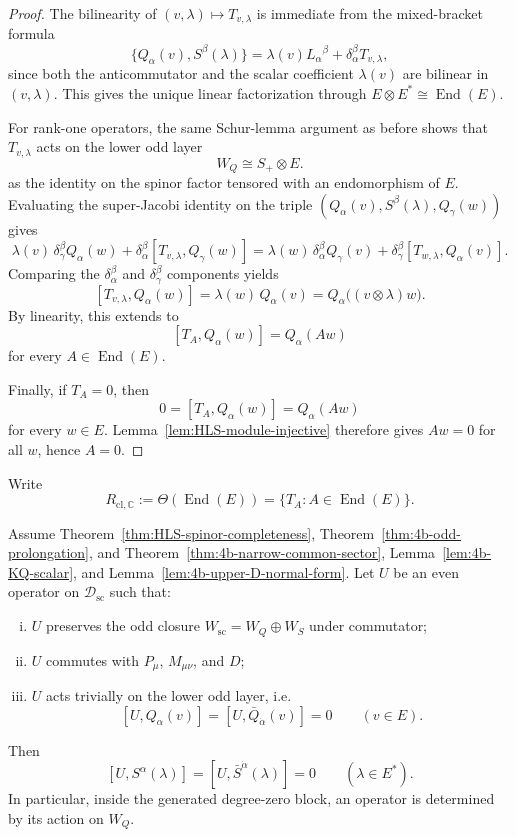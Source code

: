 \begin{proof}
The bilinearity of \((v,\lambda)\mapsto T_{v,\lambda}\) is immediate from the
mixed-bracket formula
\[
  \{Q_\alpha(v),S^\beta(\lambda)\}
  =
  \lambda(v)L_\alpha{}^\beta+\delta_\alpha^\beta T_{v,\lambda},
\]
since both the anticommutator and the scalar coefficient \(\lambda(v)\) are
bilinear in \((v,\lambda)\). This gives the unique linear factorization through
\(E\otimes E^*\cong\operatorname{End}(E)\).

For rank-one operators, the same Schur-lemma argument as before shows that
\(T_{v,\lambda}\) acts on the lower odd layer
\[
  W_Q\cong S_+\otimes E.
\]
as the identity on the spinor factor tensored with an endomorphism of \(E\).
Evaluating the super-Jacobi identity on the triple
\((Q_\alpha(v),S^\beta(\lambda),Q_\gamma(w))\) gives
\[
  \lambda(v)\,\delta_\gamma^\beta Q_\alpha(w)
  +
  \delta_\alpha^\beta [T_{v,\lambda},Q_\gamma(w)]
  =
  \lambda(w)\,\delta_\alpha^\beta Q_\gamma(v)
  +
  \delta_\gamma^\beta [T_{w,\lambda},Q_\alpha(v)].
\]
Comparing the \(\delta_\alpha^\beta\) and \(\delta_\gamma^\beta\) components yields
\[
  [T_{v,\lambda},Q_\alpha(w)]
  =
  \lambda(w)\,Q_\alpha(v)
  =
  Q_\alpha\bigl((v\otimes\lambda)w\bigr).
\]
By linearity, this extends to
\[
  [T_A,Q_\alpha(w)]
  =
  Q_\alpha(Aw)
\]
for every \(A\in\operatorname{End}(E)\).

Finally, if \(T_A=0\), then
\[
  0=[T_A,Q_\alpha(w)]=Q_\alpha(Aw)
\]
for every \(w\in E\). Lemma~\ref{lem:HLS-module-injective} therefore gives
\(Aw=0\) for all \(w\), hence \(A=0\).
\end{proof}

Write
\[
  R_{\mathrm{cl},\mathbb C}
  :=
  \Theta(\operatorname{End}(E))
  =
  \{T_A:A\in\operatorname{End}(E)\}.
\]

\begin{lemma}
\label{lem:4b-degree-zero-faithfulness}
Assume Theorem~\ref{thm:HLS-spinor-completeness},
Theorem~\ref{thm:4b-odd-prolongation}, and
Theorem~\ref{thm:4b-narrow-common-sector},
Lemma~\ref{lem:4b-KQ-scalar}, and
Lemma~\ref{lem:4b-upper-D-normal-form}. Let \(U\) be an even operator on
\(\mathcal D_{\mathrm{sc}}\) such that:
\begin{enumerate}[(i)]
  \item \(U\) preserves the odd closure \(W_{\mathrm{sc}}=W_Q\oplus W_S\) under
        commutator;
  \item \(U\) commutes with \(P_\mu\), \(M_{\mu\nu}\), and \(D\);
  \item \(U\) acts trivially on the lower odd layer, i.e.
\[
  [U,Q_\alpha(v)]
  =
  [U,\bar Q_{\dot\alpha}(v)]
  =
  0
  \qquad
  (v\in E).
\]
\end{enumerate}
Then
\[
  [U,S^\alpha(\lambda)]
  =
  [U,\bar S^{\dot\alpha}(\lambda)]
  =
  0
  \qquad
  (\lambda\in E^*).
\]
In particular, inside the generated degree-zero block, an operator is determined
by its action on \(W_Q\).
\end{lemma}


